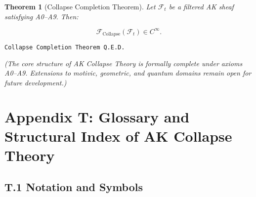\documentclass[11pt]{article}
\newtheorem{theorem}{Theorem}[section]
\begin{document}
\begin{theorem}[Collapse Completion Theorem]
Let $\mathcal{F}_t$ be a filtered AK sheaf satisfying A0–A9. Then:

\[
\mathcal{F}_{\mathrm{Collapse}}(\mathcal{F}_t) \in C^\infty.
\]
\end{theorem}

\begin{flushright}
\texttt{\large Collapse Completion Theorem \quad Q.E.D.}
\end{flushright}

\begin{center}
\small
\textit{(The core structure of AK Collapse Theory is formally complete under axioms A0–A9.  
Extensions to motivic, geometric, and quantum domains remain open for future development.)}
\end{center}




\section*{Appendix T: Glossary and Structural Index of AK Collapse Theory}

\subsection*{T.1 Notation and Symbols}
\end{document}
